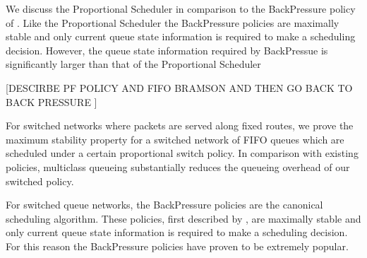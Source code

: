 \documentclass{amsart}
\begin{document}
\iffalse
The above observations focus on the functional properties of the Proportional Scheduler. There is a rich vein of work connecting the proportional fair optimization with reversible queueing systems; we compare the stochastic structure of the stationary distribution induced by the Proportional Scheduler with certain quasi-reversible queueing networks.
  Quasi-reversible processes over product state spaces often have a product form stationary distribution. When scheduling constraints are independent -- that is when the constraints of a number of queues do not restrict the schedule for the remainder of the network -- we argue that the queue sizes for distinct components should be, at least approximately, statistically independent. Thus, we can postulate that these observations hold for the Proportional Scheduler.

The Proportional Scheduler is based on the proportional fair optimization (\ref{IntroPF}) introduced in \cite{Ke97}; this optimization is known to have a close relationship with reversible queueing networks, see, e.g.,  \cite{Sc79}. 
Employing this connection, we wish to show in a future paper that, if the schedule of each network component does not restrict the schedule used by the remainder of the network then, in the heavy traffic limit,  the components of the network will be stochastically independent.
We briefly discuss this relationship and some of its implications in the current paper.  
\fi

\iffalse
We discuss the Proportional Scheduler in comparison to the BackPressure policy of \cite{TaEp92}. Like the Proportional Scheduler the BackPressure policies are maximally stable and only current queue state information is required to make a scheduling decision. However, the queue state information required by BackPressue is significantly larger than that of the Proportional Scheduler

[DESCIRBE PF POLICY AND FIFO BRAMSON AND THEN GO BACK TO BACK PRESSURE ]

 For switched networks where packets are served along fixed routes, we prove the maximum stability property for a switched network of FIFO queues which are scheduled under a certain proportional switch policy.
In comparison with existing policies, multiclass queueing substantially reduces the queueing overhead of our switched policy. 

For switched queue networks, the BackPressure policies are the canonical scheduling algorithm.
These policies, first described by \cite{TaEp92}, are maximally stable and only current queue state information is required to make a scheduling decision. 
For this reason the BackPressure policies have proven to be extremely popular.
 
\end{document}
